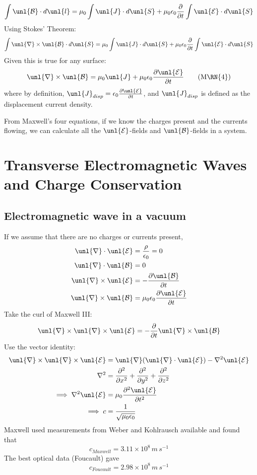 \documentclass[a4paper, 11pt, normalem]{report}
\newcommand\p{\partial}
\newcommand\E{\mathcal{E}}
\newcommand\uE{\unl{\E}}
\newcommand\B{\mathcal{B}}
\newcommand\uB{\unl{\B}}
\newcommand\del{\unl{\nabla}}
\newcommand\eno{\epsilon_0}
\newcommand\J{\unl{J}}
\begin{document}
\begin{equation*}
    \int \uB \cdot d\unl{l} = \mu_0 \int \J \cdot d\unl{S} + \mu_0\eno\frac{\p}{\p t} \int \uE \cdot d\unl{S}
\end{equation*}
Using Stokes' Theorem:
\begin{equation*}
    \int \del \times \uB \cdot d\unl{S} = \mu_0 \int \J \cdot d\unl{S} + \mu_0\eno\frac{\p}{\p t} \int \uE\cdot d\unl{S}
\end{equation*}
Given this is true for any surface:
\begin{equation}
    \del \times \uB = \mu_0\J + \mu_0\eno\frac{\p \uE}{\p t} \tag{M\RN{4}}
\end{equation}
where by definition, $\J_{disp} = \eno\frac{\p\uE}{\p t}$, and $\J_{disp}$ is defined as the displacement current density.

From Maxwell's four equations, if we know the charges present and the currents flowing, we can calculate all the $\uE$-fields and $\uB$-fields in a system.

\section{Transverse Electromagnetic Waves and Charge Conservation}
\subsection{Electromagnetic wave in a vacuum}
If we assume that there are no charges or currents present,
\begin{align*}
    \del \cdot \uE &= \frac{\rho}{\eno} = 0 \\
    \del \cdot \uB &= 0 \\
    \del \times \uE &= -\frac{\p \uB}{\p t} \\
    \del \times \uB &= \mu_0\eno\frac{\p\uE}{\p t}
\end{align*}
Take the curl of Maxwell \RN{3}:
\begin{equation*}
    \del \times \del \times \uE = -\frac{\p}{\p t} \del \times \uB
\end{equation*}
Use the vector identity:
\begin{align*}
    \del \times \del \times \uE &= \del(\del\cdot\uE) - \nabla^2\uE \\
    \nabla^2 &= \frac{\p^2}{\p x^2} + \frac{\p^2}{\p y^2} + \frac{\p^2}{\p z^2} \\
    \implies \nabla^2\uE &= \mu_0 \frac{\p^2 \uE}{\p t^2} \\
    \implies c &= \frac{1}{\sqrt{\mu_0\eno}}
\end{align*}
Maxwell used measurements from Weber and Kohlrausch available and found that
\begin{equation*}
    c_{Maxwell} = 3.11\times10^8 \,m\,s^{-1}
\end{equation*}
The best optical data (Foucault) gave
\begin{equation*}
    c_{Foucault} = 2.98\times10^8\,m\,s^{-1}
\end{equation*}
\end{document}
